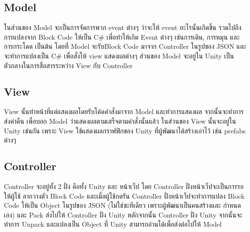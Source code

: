 \subsection{Model}
 ในส่วนของ Model จะเป็นการจัดการพวก event ต่างๆ ว่าจะให้ event อะไรนั้นเกิดขึ้น
 รวมไปถึงการแปลงจาก Block Code ให้เป็น C\# เพื่อทำให้เกิด Event ต่างๆ เช่นการเดิน, การหมุน
 และการกระโดด เป็นต้น โดยที่ Model จะรับBlock Code มาจาก Controller ในรูปของ JSON
 และจะทำการแปลงเป็น C\# เพื่อสั่งให้ view แสดงผลต่างๆ ส่วนของ Model จะอยู่ใน Unity
 เป็นตัวกลางในการสื่อสารระหว่าง View กับ Controller

\subsection{View}
View นั้นทำหน้าที่แค่แสดงผลโดยรับโค้ดคำสั่งมาจาก Model และทำการแสดงผล จากนั้นจะทำการ
ส่งค่าคืน เพื่อบอก Model ว่าแสดงผลตามเสร็จตามคำสั่งนั้นแล้ว ในส่วนของ View นั้นจะอยู่ใน
Unity เช่นกัน เพราะ View ใช้แสดงผลกราฟฟิกของ Unity ที่ผู้พัฒนาได้สร้างเอาไว้ เช่น prefabs ต่างๆ

\subsection{Controller}
Controller จะอยู่ทั้ง 2 ฝั่ง คือทั้ง Unity และ หน้าเว็ป โดย Controller ฝั่งหน้าเว็ปจะเป็นการรอให้ผู้ใช้
ลากวางตัว Block Code และเมื่อผู้ใช้กดรัน Controller ฝั่งหน้าเว็ปจะทำการแปลง Block Code ให้เป็น Object 
ในรูปของ JSON (ไม่ใช่ซะทีเดียว เพราะผู้พัฒนาเป็นคนสร้างและ กำหนดเอง\CIreply{!!}) 
และ Pack ส่งไปให้ Controller ฝั่ง Unity หลักจากนั้น Controller ฝั่ง Unity จากนั้นจะทำการ
Unpack และแปลงเป็น Object ที่ Unity สามารถอ่านได้เพื่อส่งต่อไปให้ Model

